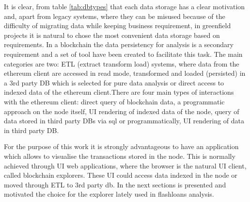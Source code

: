 \documentclass[11pt,a4paper,titlepage]{scrartcl}
\begin{document}
It is clear, from table \ref{tab:dbtypes}  that each data storage has a clear motivation and, apart from legacy systems, where they can be misused because of the difficulty of migrating data while keeping business requirement, in greenfield projects it is natural to chose the most convenient data storage based on requirements.
In a blockchain the data persistency for  analysis is a secondary requirement and a set of tool have been created to facilitate this task. The main categories are two: ETL (extract transform load) systems, where data from the ethereum client are accessed in read mode, transformed and loaded (persisted) in a 3rd party DB which is selected for pure data analysis  or direct access to indexed data of the ethereum client.There are four main types of interactions with the ethereum client: direct query of blockchain data, a programmatic approach on the node itself, UI rendering of indexed data of the node, query of data stored in third party DBs via sql or programmatically, UI rendering of data in third party DB. 


\begin{table}[ht]
\centering
\caption{Database Types, Implementations, and Usage}
\label{tab:dbtypes}
\end{table}



For the purpose of this work it is strongly advantageous to have an application which allows to visualise the transactions stored in the node. This is normally achieved through UI web applications, where the browser is the natural UI client, called blockchain explorers. These UI could access data indexed in the node or moved through ETL to 3rd party db. In the next sections is presented and motivated the choice for the explorer lately used in flashloans analysis.
\end{document}
